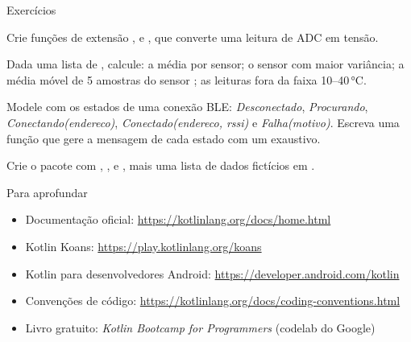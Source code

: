 \documentclass[aspectratio=169,10pt]{beamer}
\begin{document}
\begin{frame}{Exercícios}
  \begin{exercicio}
    Crie funções de extensão ,  e , que converte uma leitura de ADC em tensão.
  \end{exercicio}
  \begin{exercicio}
    Dada uma lista de , calcule: a média por sensor; o sensor com maior variância; a média móvel de 5 amostras do sensor ; as leituras fora da faixa 10--40\,°C.
  \end{exercicio}
  \begin{exercicio}
    Modele com  os estados de uma conexão BLE: \emph{Desconectado}, \emph{Procurando}, \emph{Conectando(endereco)}, \emph{Conectado(endereco, rssi)} e \emph{Falha(motivo)}. Escreva uma função que gere a mensagem de cada estado com um  exaustivo.
  \end{exercicio}
  \begin{projeto}
    Crie o pacote  com , ,  e , mais uma lista de dados fictícios em .
  \end{projeto}
\end{frame}

\begin{frame}{Para aprofundar}
  \small
  \begin{itemize}
    \item Documentação oficial: \url{https://kotlinlang.org/docs/home.html}
    \item Kotlin Koans: \url{https://play.kotlinlang.org/koans}
    \item Kotlin para desenvolvedores Android: \url{https://developer.android.com/kotlin}
    \item Convenções de código: \url{https://kotlinlang.org/docs/coding-conventions.html}
    \item Livro gratuito: \emph{Kotlin Bootcamp for Programmers} (codelab do Google)
  \end{itemize}
\end{frame}

\end{document}
